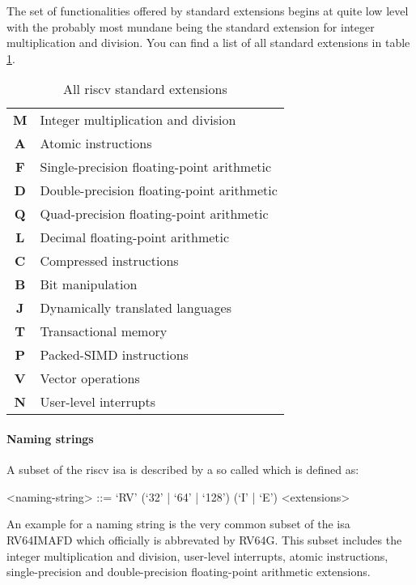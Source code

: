 The set of functionalities offered by standard extensions begins at quite low level with the probably most mundane being the standard extension for integer multiplication and division.
You can find a list of all standard extensions in table \ref{tbl:rv-exts}.

\begin{table}
    \centering
    \begin{tabular}{| c | l |}
        \hline
        \textbf{M} & Integer multiplication and division \\
        \textbf{A} & Atomic instructions \\
        \textbf{F} & Single-precision floating-point arithmetic \\
        \textbf{D} & Double-precision floating-point arithmetic \\
        \textbf{Q} & Quad-precision floating-point arithmetic \\
        \textbf{L} & Decimal floating-point arithmetic \\
        \textbf{C} & Compressed instructions \\
        \textbf{B} & Bit manipulation \\
        \textbf{J} & Dynamically translated languages \\
        \textbf{T} & Transactional memory \\
        \textbf{P} & Packed-SIMD instructions \\
        \textbf{V} & Vector operations \\
        \textbf{N} & User-level interrupts \\
        \hline
    \end{tabular}
    \caption{All \gls{riscv} standard extensions}
    \label{tbl:rv-exts}
\end{table}

\paragraph{Naming strings}
A subset of the \gls{riscv} \gls{isa} is described by a so called  which is defined as:

\begin{grammar}
    <naming-string> ::= `RV' (`32' | `64' | `128') (`I' | `E') <extensions>
\end{grammar}

An example for a naming string is the very common subset of the \gls{isa} RV64IMAFD which officially is abbrevated by RV64G.
This subset includes the integer multiplication and division, user-level interrupts, atomic instructions, single-precision and double-precision floating-point arithmetic extensions.

